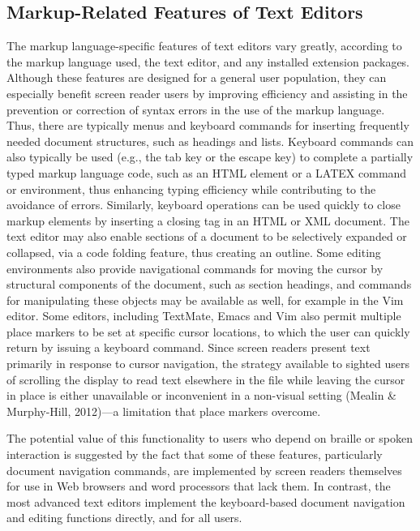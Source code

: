 \documentclass[11pt]{sig-alternate}
\begin{document}
\begin{large}
\subsection*{Markup-Related Features of Text Editors}
The markup language-specific features of text editors vary greatly, according to the markup language used, the text editor, and any installed extension packages. Although these features are designed for a general user population, they can especially benefit screen reader users by improving efficiency and assisting in the prevention or correction of syntax errors in the use of the markup language. Thus, there are typically menus and keyboard commands for inserting frequently needed document structures, such as headings and lists. Keyboard commands can also typically be used (e.g., the tab key or the escape key) to complete a partially typed markup language code, such as an HTML element or a LATEX command or environment, thus enhancing typing efficiency while contributing to the avoidance of errors. Similarly, keyboard operations can be used quickly to close markup elements by inserting a closing tag in an HTML or XML document. The text editor may also enable sections of a document to be selectively expanded or collapsed, via a code folding feature, thus creating an outline. Some editing environments also provide navigational commands for moving the cursor by structural components of the document, such as section headings, and commands for manipulating these objects may be available as well, for example in the Vim editor. Some editors, including TextMate, Emacs and Vim also permit multiple place markers to be set at specific cursor locations, to which the user can quickly return by issuing a keyboard command. Since screen readers present text primarily in response to cursor navigation, the strategy available to sighted users of scrolling the display to read text elsewhere in the file while leaving the cursor in place is either unavailable or inconvenient in a non-visual setting (Mealin \& Murphy-Hill, 2012)—a limitation that place markers overcome.

The potential value of this functionality to users who depend on braille or spoken interaction is suggested by the fact that some of these features, particularly document navigation commands, are implemented by screen readers themselves for use in Web browsers and word processors that lack them. In contrast, the most advanced text editors implement the keyboard-based document navigation and editing functions directly, and for all users.


\end{large}
\end{document}
